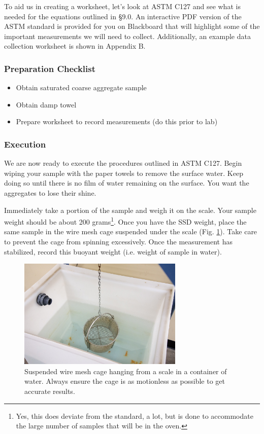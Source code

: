 \documentclass[12pt]{article}
\begin{document}
To aid us in creating a worksheet, let's look at ASTM C127 and see what is needed for the equations outlined in \S 9.0. An interactive PDF version of the ASTM standard is provided for you on Blackboard that will highlight some of the important measurements we will need to collect. Additionally, an example data collection worksheet is shown in Appendix B.

\subsubsection*{Preparation Checklist}
\begin{itemize}
    \item Obtain saturated coarse aggregate sample
    \item Obtain damp towel
    \item Prepare worksheet to record measurements (do this prior to lab)
\end{itemize}

\subsubsection{Execution}
We are now ready to execute the procedures outlined in ASTM C127. Begin wiping your sample with the paper towels to remove the surface water. Keep doing so until there is no film of water remaining on the surface. You want the aggregates to lose their shine.

Immediately take a portion of the sample and weigh it on the scale. Your sample weight should be about 200 grams\footnote{Yes, this does deviate from the standard, a lot, but is done to accommodate the large number of samples that will be in the oven.}. Once you have the SSD weight, place the same sample in the wire mesh cage suspended under the scale (Fig. \ref{fig:cage}). Take care to prevent the cage from spinning excessively. Once the measurement has stabilized, record this buoyant weight (i.e. weight of sample in water).

\begin{figure}[H]
    \centering
    \includegraphics[width=0.7\textwidth]{GEO_5852.jpg}
    \caption{Suspended wire mesh cage hanging from a scale in a container of water. Always ensure the cage is as motionless as possible to get accurate results.}
    \label{fig:cage}
\end{figure}
\end{document}
